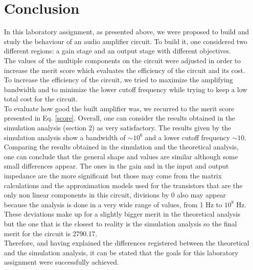 \section{Conclusion}
In this laboratory assignment, as presented above, we were proposed to build and study the behaviour of an audio amplifier circuit. To build it, one considered two different regions: a gain stage and an output stage with different objectives. \\

The values of the multiple components on the circuit were adjusted in order to increase the merit score which evaluates the efficiency of the circuit and its cost. To increase the efficiency of the circuit, we tried to maximize the amplifying bandwidth and to minimize the lower cutoff frequency while trying to keep a low total cost for the circuit. \\

To evaluate how good the built amplifier was, we recurred to the merit score presented in Eq. \eqref{score}.  Overall, one can consider the results obtained in the simulation analysis (section 2) as very satisfactory. The results given by the simulation analysis show a bandwidth of $\sim 10^6$ and a lower cutoff frequency $\sim 10$. \\

Comparing the results obtained in the simulation and the theoretical analysis, one can conclude that the general shape and values are similar although some small differences appear. The ones in the gain and in the input and output impedance are the more significant but those may come from the matrix calculations and the approximation models used for the transistors that are the only non linear components in this circuit, divisions by 0 also may appear because the analysis is done in a very wide range of values, from 1 Hz to $10^8$ Hz. These deviations make up for a slightly bigger merit in the theoretical analysis but the one that is the closest to reality is the simulation analysis so the final merit for the circuit is 2790.17.\\

Therefore, and having explained the differences registered between the theoretical and the simulation analysis, it can be stated that the goals for this laboratory assignment were successfully achieved.